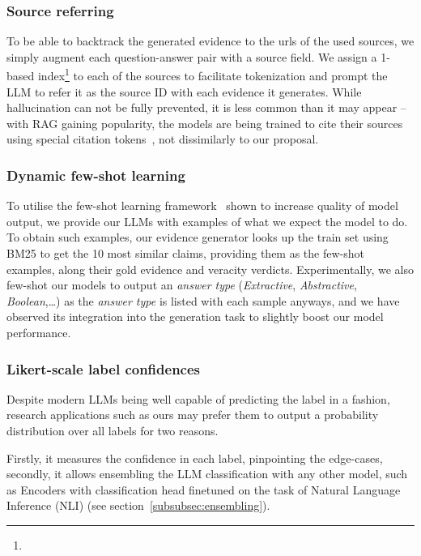 \subsubsection{Source referring}
To be able to backtrack the generated evidence to the urls of the used sources, we simply augment each question-answer pair with a source field.
We assign a 1-based index\footnote{}  to each of the sources to facilitate tokenization and prompt the LLM to refer it as the source ID with each evidence it generates.
While hallucination can not be fully prevented, it is less common than it may appear -- with RAG gaining popularity, the models are being trained to cite their sources using special citation tokens~\cite{menick2022teachinglanguagemodelssupport}, not dissimilarly to our proposal.

\subsubsection{Dynamic few-shot learning}
To utilise the few-shot learning framework~\cite{fewshot} shown to increase quality of model output, we provide our LLMs with examples of what we expect the model to do.
To obtain such examples, our evidence generator looks up the \averitec{} train set using BM25 to get the 10 most similar claims, providing them as the few-shot examples, along their gold evidence and veracity verdicts.
Experimentally, we also few-shot our models to output an \textit{answer type} (\textit{Extractive}, \textit{Abstractive}, \textit{Boolean},\dots) as the \textit{answer type} is listed with each sample anyways, and we have observed its integration into the generation task to slightly boost our model performance.

\subsubsection{Likert-scale label confidences}
\label{likert}
Despite modern LLMs being well capable of predicting the label in a  fashion, research applications such as ours may prefer them to output a probability distribution over all labels for two reasons.

Firstly, it measures the confidence in each label, pinpointing the edge-cases, secondly, it allows ensembling the LLM classification with any other model, such as Encoders with classification head finetuned on the task of Natural Language Inference (NLI) (see section~\ref{subsubsec:ensembling}).

